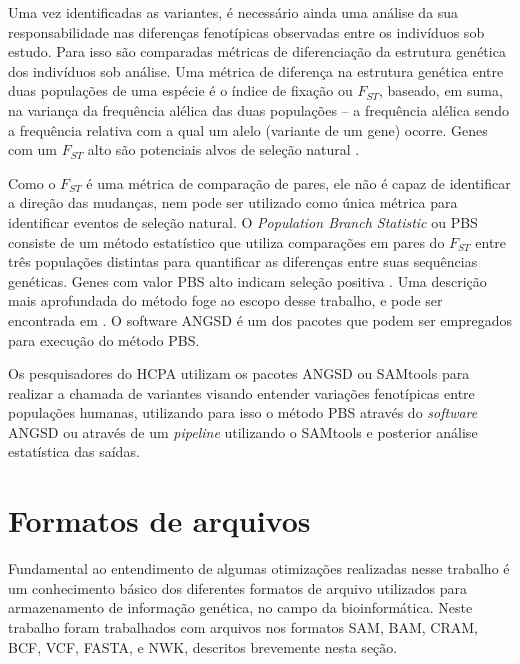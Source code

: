 \documentclass[cic,tc]{iiufrgs}
\begin{document}
Uma vez identificadas as variantes, é necessário ainda uma análise da sua
responsabilidade nas diferenças fenotípicas observadas entre os indivíduos sob
estudo. Para isso são comparadas métricas de diferenciação da estrutura
genética dos indivíduos sob análise. Uma métrica de diferença na estrutura
genética entre duas populações de uma espécie é o índice de fixação ou
$F_{ST}$, baseado, em suma, na variança da frequência alélica das duas
populações -- a frequência alélica sendo a frequência relativa com a qual um
alelo (variante de um gene) ocorre. Genes com um $F_{ST}$ alto são potenciais
alvos de seleção natural \cite{yi2010sequencing}.

Como o $F_{ST}$ é uma métrica de comparação de pares, ele não é capaz de
identificar a direção das mudanças, nem pode ser utilizado como única métrica
para identificar eventos de seleção natural. O \textit{Population Branch
Statistic} ou PBS consiste de um método estatístico que utiliza comparações em
pares do $F_{ST}$ entre três populações distintas para quantificar as
diferenças entre suas sequências genéticas. Genes com valor PBS alto indicam
seleção positiva \cite{jiang2019population}. Uma descrição mais aprofundada do
método foge ao escopo desse trabalho, e pode ser encontrada em
\cite{yi2010sequencing}. O software ANGSD é um dos pacotes que podem ser
empregados para execução do método PBS.

Os pesquisadores do HCPA utilizam os pacotes ANGSD ou SAMtools para realizar a
chamada de variantes visando entender variações fenotípicas entre populações
humanas, utilizando para isso o método PBS através do \textit{software} ANGSD ou através
de um \textit{pipeline} utilizando o SAMtools e posterior análise estatística das
saídas.

\section{Formatos de arquivos}
\label{sec:formats}


Fundamental ao entendimento de algumas otimizações realizadas nesse trabalho é
um conhecimento básico dos diferentes formatos de arquivo utilizados para
armazenamento de informação genética, no campo da bioinformática. Neste
trabalho foram trabalhados com arquivos nos formatos SAM, BAM, CRAM, BCF, VCF,
FASTA, e NWK, descritos brevemente nesta seção.
\end{document}
